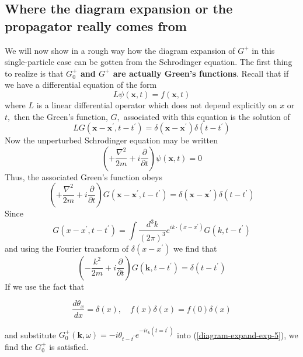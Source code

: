 \subsection{Where the diagram expansion or the propagator really comes from}
We will now show in a rough way how the diagram expansion of $G^{+}$ in this single-particle case can be gotten from the Schrodinger equation. The first thing to realize is that \textbf{$G_{0}^{+}$ and $G^{+}$ are actually Green's functions}. Recall that if we have a differential equation of the form
\begin{equation}L \psi(\mathbf{x}, t)=f(\mathbf{x}, t)
\label{diagram-expand-exp-1}
\end{equation}
where $L$ is a linear differential operator which does not depend explicitly on $x$ or $t,$ then the Green's function, $G,$ associated with this equation is the solution of
\begin{equation}L G\left(\mathbf{x}-\mathbf{x}^{\prime}, t-t^{\prime}\right)=\delta\left(\mathbf{x}-\mathbf{x}^{\prime}\right) \delta\left(t-t^{\prime}\right)
\label{diagram-expand-exp-2}
\end{equation}
Now the unperturbed Schrodinger equation may be written
$$\left(+\frac{\nabla^{2}}{2 m}+i \frac{\partial}{\partial t}\right) \psi(\mathbf{x}, t)=0$$
Thus, the associated Green's function obeys
\begin{equation}\left(+\frac{\nabla^{2}}{2 m}+i \frac{\partial}{\partial t}\right) G\left(\mathbf{x}-\mathbf{x}^{\prime}, t-t^{\prime}\right)=\delta\left(\mathbf{x}-\mathbf{x}^{\prime}\right)\delta\left(t-t^{\prime}\right)
\label{diagram-expand-exp-3}
\end{equation}
Since
\begin{equation}G\left(x-x^{\prime}, t-t^{\prime}\right)=\int \frac{d^{3} k}{(2 \pi)^{3}} e^{i k \cdot\left(x-x^{\prime}\right)} G\left(k, t-t^{\prime}\right)
\label{diagram-expand-exp-4}
\end{equation}
and using the Fourier transform of $\delta(x-x^{\prime})$ we find that
\begin{equation}\left(-\frac{k^{2}}{2 m}+i \frac{\partial}{\partial t}\right) G\left(\mathbf{k}, t-t^{\prime}\right)=\delta\left(t-t^{\prime}\right)
\label{diagram-expand-exp-5}
\end{equation}
If we use the fact that
\begin{imp}
\begin{equation}\frac{d \theta_{x}}{d x}=\delta(x), \quad f(x) \delta(x)=f(0) \delta(x)
\label{diagram-expand-exp-6}
\end{equation}
\end{imp}
and substitute $G^+_0(\mathbf{k},\omega)=-i\theta_{t-t^{\prime}}e^{-i\epsilon_k(t=t^{\prime})}$ into (\ref{diagram-expand-exp-5}), we find the $G_0^+$ is satisfied.

